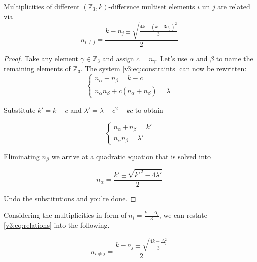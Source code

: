 \begin{theorem}
    \label{v3:theorem:relations}
    Multiplicities of different $(\mathbb Z_3,k)$-difference multiset elements $i$ un $j$ are related via
    \begin{equation}
        \label{v3:eq:relations}
        n_{i\neq j} = \frac{k-n_j \pm \sqrt{\frac{4k-(k-3n_j)^2}{3}}}{2}
    \end{equation}
\end{theorem}

\begin{proof}
    Take any element $\gamma \in \mathbb Z_3$ and assign $c = n_\gamma$. Let's use $\alpha$ and $\beta$ to name the remaining elements of $\mathbb Z_3$. The system \eqref{v3:eq:constraints} can now be rewritten:
    \begin{equation}
        \begin{cases}
            n_\alpha + n_\beta = k - c \\
            n_\alpha n_\beta + c (n_\alpha + n_\beta)  = \lambda 
        \end{cases}
    \end{equation}
    
    Substitute $k'=k-c$ and $\lambda' = \lambda + c^2-kc$ to obtain
    
    \begin{equation}
        \begin{cases}
            n_\alpha + n_\beta = k' \\
            n_\alpha n_\beta = \lambda'
        \end{cases}
    \end{equation}
    
    Eliminating $n_\beta$ we arrive at a quadratic equation that is solved into
    
    \begin{equation}
        n_\alpha = \frac{k' \pm \sqrt{k'^2-4\lambda'}}{2}
    \end{equation}
    
    Undo the substitutions and you're done.
\end{proof}

Considering the multiplicities in form of $n_i = \frac{k+\Delta_i}{3}$, we can restate \eqref{v3:eq:relations} into the following.

\begin{equation}
    \label{v3:eq:relations_delta}
    n_{i\neq j} = \frac{k-n_j \pm \sqrt{\frac{4k-\Delta_j^2}{3}}}{2}
\end{equation}


